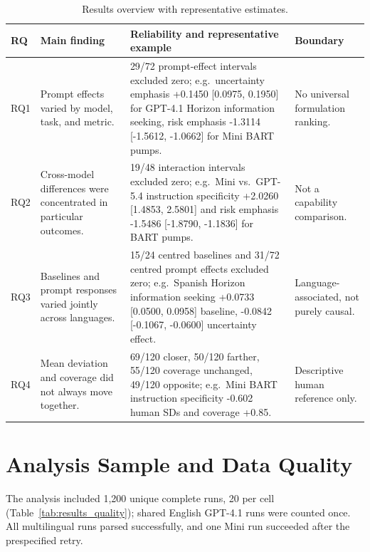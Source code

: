 \documentclass[logo,msc,inf]{infthesis}       %
\begin{document}
\begin{table}[htbp]
\centering
\caption{Results overview with representative estimates.}
\label{tab:rq_summary}
\begin{tabularx}{\textwidth}{@{}p{0.7cm}p{3.0cm}Xp{3.2cm}@{}}
\toprule
RQ & Main finding & Reliability and representative example & Boundary \\
\midrule
RQ1 & Prompt effects varied by model, task, and metric. & 29/72 prompt-effect intervals excluded zero; e.g.\ uncertainty emphasis +0.1450 [0.0975, 0.1950] for GPT-4.1 Horizon information seeking, risk emphasis -1.3114 [-1.5612, -1.0662] for Mini BART pumps. & No universal formulation ranking. \\
RQ2 & Cross-model differences were concentrated in particular outcomes. & 19/48 interaction intervals excluded zero; e.g.\ Mini vs.\ GPT-5.4 instruction specificity +2.0260 [1.4853, 2.5801] and risk emphasis -1.5486 [-1.8790, -1.1836] for BART pumps. & Not a capability comparison. \\
RQ3 & Baselines and prompt responses varied jointly across languages. & 15/24 centred baselines and 31/72 centred prompt effects excluded zero; e.g.\ Spanish Horizon information seeking +0.0733 [0.0500, 0.0958] baseline, -0.0842 [-0.1067, -0.0600] uncertainty effect. & Language-associated, not purely causal. \\
RQ4 & Mean deviation and coverage did not always move together. & 69/120 closer, 50/120 farther, 55/120 coverage unchanged, 49/120 opposite; e.g.\ Mini BART instruction specificity -0.602 human SDs and coverage +0.85. & Descriptive human reference only. \\
\bottomrule
\end{tabularx}
\end{table}


\section{Analysis Sample and Data Quality}

The analysis included 1,200 unique complete runs, 20 per cell (Table~\ref{tab:results_quality}); shared English GPT-4.1 runs were counted once. All multilingual runs parsed successfully, and one Mini run succeeded after the prespecified retry.
\end{document}
